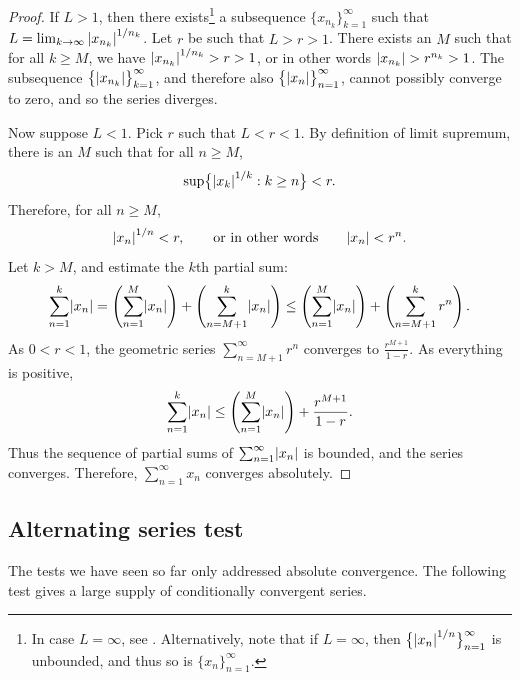\begin{proof}
If $L > 1$, then there exists\footnote{%
In case $L=\infty$, see .
Alternatively, note that if $L=\infty$, then $\bigl\{ {\lvert {x_{n}} \rvert}^{1/n}
\bigr\}_{n=1}^\infty$
is unbounded, and thus so is
$\{ x_n \}_{n=1}^\infty$.}
a subsequence $\{ x_{n_k} \}_{k=1}^\infty$ such that
$L = \lim_{k\to\infty} {\lvert {x_{n_k}} \rvert}^{1/n_k}$.  Let
$r$ be such that $L > r > 1$.  There exists an $M$ such
that for all $k \geq M$, we have 
${\lvert {x_{n_k}} \rvert}^{1/n_k} > r > 1$, or in other words
$\lvert {x_{n_k}} \rvert > r^{n_k} > 1$.
The subsequence 
$\bigl\{ \lvert {x_{n_k}} \rvert \bigr\}_{k=1}^\infty$,
and therefore also
$\bigl\{ \lvert {x_{n}} \rvert \bigr\}_{n=1}^\infty$,
cannot possibly converge to zero, and so the series diverges.

Now suppose $L < 1$.  Pick $r$ such that $L < r < 1$.
By definition of limit supremum,
there is an $M$ such that for all $n \geq M$,
\begin{equation*}
\sup \bigl\{ {\lvert {x_k} \rvert}^{1/k} : k \geq n \bigr\} < r .
\end{equation*}
Therefore, for all $n \geq M$,
\begin{equation*}
{\lvert {x_n} \rvert}^{1/n} < r , \qquad \text{or in other words} \qquad \lvert {x_n} \rvert < r^n .
\end{equation*}
Let $k > M$, and estimate the $k$th partial sum:
\begin{equation*}
\sum_{n=1}^k \lvert {x_n} \rvert = 
\left( \sum_{n=1}^M \lvert {x_n} \rvert \right) + 
\left( \sum_{n=M+1}^k \lvert {x_n} \rvert \right)
\leq
\left( \sum_{n=1}^M \lvert {x_n} \rvert \right) + 
\left( \sum_{n=M+1}^k r^n \right) .
\end{equation*}
As $0 < r < 1$,
the geometric series $\sum_{n=M+1}^\infty r^n$ converges to
$\frac{r^{M+1}}{1-r}$.  As everything is positive,
\begin{equation*}
\sum_{n=1}^k \lvert {x_n} \rvert 
\leq
\left( \sum_{n=1}^M \lvert {x_n} \rvert \right) + 
\frac{r^{M+1}}{1-r} .
\end{equation*}
Thus the sequence of partial sums of $\sum_{n=1}^\infty \lvert {x_n} \rvert$ is bounded, and
the series converges.  Therefore, $\sum_{n=1}^\infty x_n$ converges absolutely.
\end{proof}

\subsection{Alternating series test}

The tests we have seen so far only addressed absolute convergence.  The
following test gives a large supply of conditionally convergent series.

